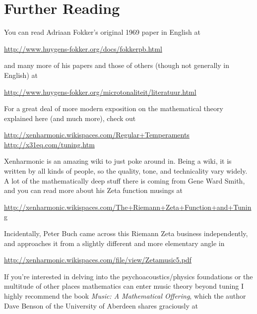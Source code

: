 \documentclass[12pt]{article}
\begin{document}
\section{Further Reading}

You can read Adriaan Fokker's original 1969 paper in English at 

\begin{center}
\url{http://www.huygens-fokker.org/docs/fokkerpb.html}
\end{center}
and many more of his papers and those of others (though not generally in English) at

\begin{center}
\url{http://www.huygens-fokker.org/microtonaliteit/literatuur.html}
\end{center}

\par
For a great deal of more modern exposition on the mathematical theory explained here (and much more), check out
\begin{center}
\url{http://xenharmonic.wikispaces.com/Regular+Temperaments}\\
\url{http://x31eq.com/tuning.htm}
\end{center}
\par
Xenharmonic is an amazing wiki to just poke around in.  Being a wiki, it is written by all kinds of people, so the quality, tone, and technicality vary widely.  A lot of the mathematically deep stuff there is coming from Gene Ward Smith, and you can read more about his Zeta function musings at
\begin{center}
\url{http://xenharmonic.wikispaces.com/The+Riemann+Zeta+Function+and+Tuning}
\end{center}
\par
Incidentally, Peter Buch came across this Riemann Zeta business independently, and approaches it from a slightly different and more elementary angle in
\begin{center}
\url{http://xenharmonic.wikispaces.com/file/view/Zetamusic5.pdf}
\end{center}
\par
If you're interested in delving into the psychoacoustics/physics foundations or the multitude of other places mathematics can enter music theory beyond tuning I highly recommend the book \emph{Music: A Mathematical Offering}, which the author Dave Benson of the University of Aberdeen shares graciously at
\end{document}
